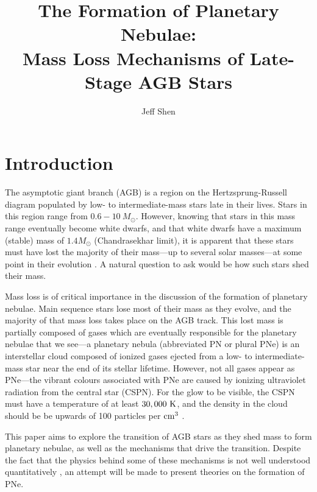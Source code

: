 \documentclass[twocolumn]{aastex63}
\begin{document}
\author{Jeff Shen}
\title{The Formation of Planetary Nebulae: \\
Mass Loss Mechanisms of Late-Stage AGB Stars} 


\section{Introduction} \label{sec:intro}

The asymptotic giant branch (AGB) is a region on the Hertzsprung-Russell diagram populated by low- to intermediate-mass stars late in their lives. Stars in this region range from $0.6-10~M_\odot$. However, knowing that stars in this mass range eventually become white dwarfs, and that white dwarfs have a maximum (stable) mass of $1.4 M_\odot$ (Chandrasekhar limit), it is apparent that these stars must have lost the majority of their mass—up to several solar masses—at some point in their evolution \cite{willson}. A natural question to ask would be how such stars shed their mass. 

Mass loss is of critical importance in the discussion of the formation of planetary nebulae. Main sequence stars lose most of their mass as they evolve, and the majority of that mass loss takes place on the AGB track. This lost mass is partially composed of gases which are eventually responsible for the planetary nebulae that we see—a planetary nebula (abbreviated PN or plural PNe) is an interstellar cloud composed of ionized gases ejected from a low- to intermediate-mass star near the end of its stellar lifetime. However, not all gases appear as PNe—the vibrant colours associated with PNe are caused by ionizing ultraviolet radiation from the central star (CSPN). For the glow to be visible, the CSPN must have a temperature of at least $30,000~{\rm K}$, and the density in the cloud should be be upwards of 100 particles per ${\rm cm^{3}}$ \citep{prialnik}.

This paper aims to explore the transition of AGB stars as they shed mass to form planetary nebulae, as well as the mechanisms that drive the transition. Despite the fact that the physics behind some of these mechanisms is not well understood quantitatively \citep{blocker}, an attempt will be made to present theories on the formation of PNe.

\end{document}
